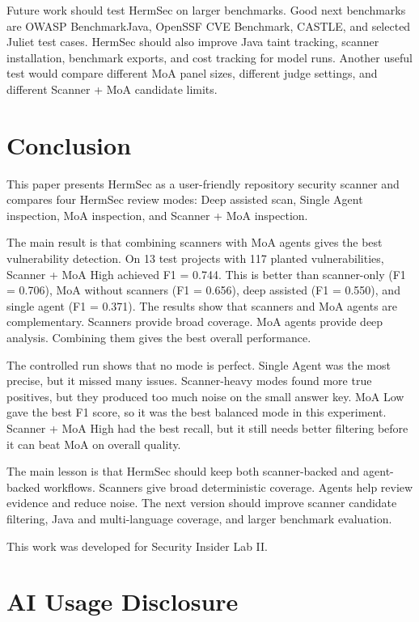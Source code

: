 \documentclass[sigconf,nonacm]{acmart}
\begin{document}
Future work should test HermSec on larger benchmarks. Good next benchmarks are OWASP BenchmarkJava, OpenSSF CVE Benchmark, CASTLE, and selected Juliet test cases. HermSec should also improve Java taint tracking, scanner installation, benchmark exports, and cost tracking for model runs. Another useful test would compare different MoA panel sizes, different judge settings, and different Scanner + MoA candidate limits.

\section{Conclusion}
This paper presents HermSec as a user-friendly repository security scanner and compares four HermSec review modes: Deep assisted scan, Single Agent inspection, MoA inspection, and Scanner + MoA inspection.

The main result is that combining scanners with MoA agents gives the best vulnerability detection. On 13 test projects with 117 planted vulnerabilities, Scanner + MoA High achieved F1 = 0.744. This is better than scanner-only (F1 = 0.706), MoA without scanners (F1 = 0.656), deep assisted (F1 = 0.550), and single agent (F1 = 0.371). The results show that scanners and MoA agents are complementary. Scanners provide broad coverage. MoA agents provide deep analysis. Combining them gives the best overall performance.

The controlled run shows that no mode is perfect. Single Agent was the most precise, but it missed many issues. Scanner-heavy modes found more true positives, but they produced too much noise on the small answer key. MoA Low gave the best F1 score, so it was the best balanced mode in this experiment. Scanner + MoA High had the best recall, but it still needs better filtering before it can beat MoA on overall quality.

The main lesson is that HermSec should keep both scanner-backed and agent-backed workflows. Scanners give broad deterministic coverage. Agents help review evidence and reduce noise. The next version should improve scanner candidate filtering, Java and multi-language coverage, and larger benchmark evaluation.

\begin{acks}
This work was developed for Security Insider Lab II.
\end{acks}

\section*{AI Usage Disclosure}
\end{document}
